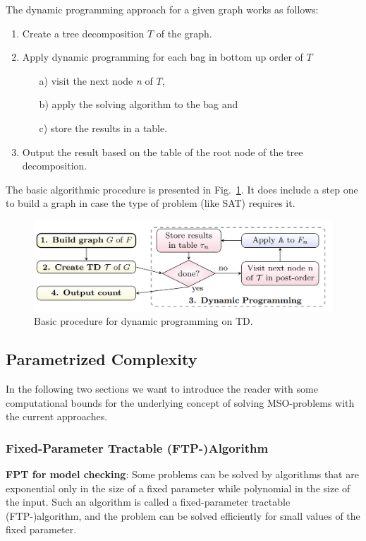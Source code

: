 \documentclass[a4paper, 12pt, bibliography=totoc]{scrartcl}
\begin{document}
The dynamic programming approach for a given graph works as follows:
\begin{enumerate}
	\filbreak
	\item Create a tree decomposition ${T}$ of the graph.
	\item Apply dynamic programming for each bag in bottom up order of ${T}$
	\begin{itemize}
		\item[a)] visit the next node \textit{n} of ${T}$,
		\item[b)] apply the solving algorithm to the bag and
		\item[c)] store the results in a table.
	\end{itemize}
	\item Output the result based on the table of the root node of the tree decomposition.
\end{enumerate}

The basic algorithmic procedure is presented in Fig.~\ref{fig:dpalgo}. It does include a step one to build a graph in case the type of problem (like SAT) requires it.
\begin{figure}[h]
	\centering
	\includegraphics{images/DPAlgo31.png}
	\caption{ Basic procedure for dynamic programming on TD. \cite[Figure~3.1]{DiplomarbeitZisser} }
	\label{fig:dpalgo}
\end{figure}


\subsection{Parametrized Complexity}
In the following two sections we want to introduce the reader with some computational bounds for the underlying concept of solving MSO-problems with the current approaches.

\subsubsection{Fixed-Parameter Tractable (FTP-)Algorithm}

\textbf{FPT for model checking}:
Some problems can be solved by algorithms that are exponential only in the size of a fixed parameter while polynomial in the size of the input. Such an algorithm is called a fixed-parameter tractable (FTP-)algorithm, and the problem can be solved efficiently for small values of the fixed parameter. \cite{ParamCompGrohe}
\end{document}

